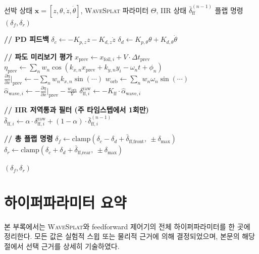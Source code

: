 \documentclass[11pt]{report}
\numberwithin{equation}{chapter}
\numberwithin{figure}{chapter}
\numberwithin{table}{chapter}
\newcommand{\WS}{\textsc{WaveSplat}}
\begin{document}
\begin{algorithm}[H]
\caption{Wave-preview feedforward 제어}
\label{alg:feedforward}
\begin{algorithmic}[1]
\REQUIRE 선박 상태 $\mathbf{x} = [z, \theta, \dot{z}, \dot{\theta}]$,
  \WS{} 파라미터 $\Theta$, IIR 상태 $\bar{\delta}_{\text{ff}}^{(n-1)}$
\ENSURE 플랩 명령 $(\delta_f, \delta_r)$

\STATE \textbf{// PD 피드백}
\STATE $\delta_c \leftarrow -K_{p,z} z - K_{d,z} \dot{z}$ 
\STATE $\delta_d \leftarrow K_{p,\theta} \theta + K_{d,\theta} \dot{\theta}$ 

\STATE \textbf{// 파도 미리보기 평가}
  \STATE $x_{\text{prev}} \leftarrow x_{\text{foil},i} + V \cdot \Delta t_{\text{prev}}$
  \STATE $\eta_{\text{prev}} \leftarrow \sum_n w_n \cos(k_{x,n} x_{\text{prev}} + k_{y,n} y_i - \omega_n t + \phi_n)$
  \STATE $\frac{\partial\eta}{\partial x}\big|_{\text{prev}} \leftarrow -\sum_n w_n k_{x,n} \sin(\cdots)$ 
  \STATE $w_{\text{orb}} \leftarrow \sum_n w_n \omega_n \sin(\cdots)$ 
  \STATE $\hat{\alpha}_{\text{wave},i} \leftarrow -\frac{\partial\eta}{\partial x}\big|_{\text{prev}} - \frac{w_{\text{orb}}}{V}$
  \STATE $\delta_{\text{ff},i}^{\text{raw}} \leftarrow -K_{\text{ff}} \cdot \hat{\alpha}_{\text{wave},i}$
\ENDFOR

\STATE \textbf{// IIR 저역통과 필터 (주 타임스텝에서 1회만)}
  \STATE $\bar{\delta}_{\text{ff},i} \leftarrow \alpha \cdot \delta_{\text{ff},i}^{\text{raw}} + (1-\alpha) \cdot \bar{\delta}_{\text{ff},i}^{(n-1)}$
\ENDFOR

\STATE \textbf{// 총 플랩 명령}
\STATE $\delta_f \leftarrow \text{clamp}(\delta_c - \delta_d + \bar{\delta}_{\text{ff,front}},\ \pm\delta_{\max})$
\STATE $\delta_r \leftarrow \text{clamp}(\delta_c + \delta_d + \bar{\delta}_{\text{ff,rear}},\ \pm\delta_{\max})$

\RETURN $(\delta_f, \delta_r)$
\end{algorithmic}
\end{algorithm}

\chapter{하이퍼파라미터 요약}
\label{app:hyperparams}

본 부록에서는 \WS{}와 feedforward 제어기의 전체 하이퍼파라미터를 한 곳에 정리한다.
모든 값은 실험적 스윕 또는 물리적 근거에 의해 결정되었으며,
본문의 해당 절에서 선택 근거를 상세히 기술하였다.
\end{document}
